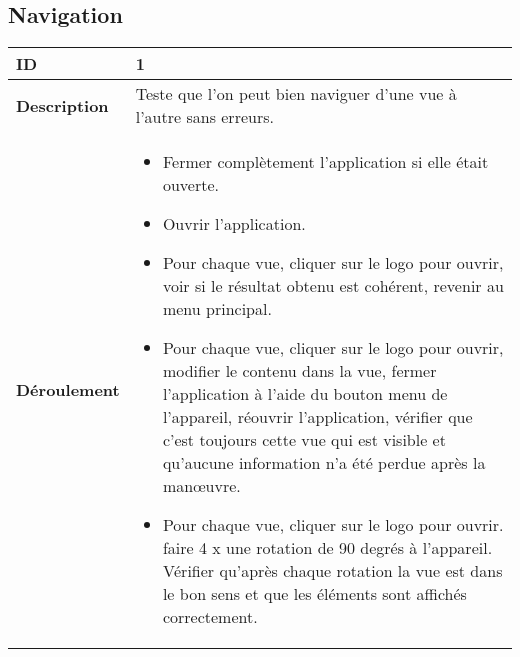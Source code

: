 	\subsection{Navigation}
				 \begin{longtable}{m{4cm}|p{10cm}|}
				 \textbf{ ID} & 1 \\
				 \hline \textbf{Description} & Teste que l'on peut bien naviguer d'une vue à l'autre sans erreurs.\\
				 \hline \textbf{Déroulement} &
					 \begin{itemize}
						 \item Fermer complètement l'application si elle était ouverte.
						 \item Ouvrir l'application.
						 \item  Pour chaque vue, cliquer sur le logo pour ouvrir, voir si le résultat obtenu est cohérent, revenir au menu principal.
						 \item  Pour chaque vue, cliquer sur le logo pour ouvrir, modifier le contenu dans la vue, fermer l'application à l'aide du bouton menu de l'appareil, réouvrir l'application, vérifier que c'est toujours cette vue qui est visible et qu'aucune information n'a été perdue après la manœuvre. 
						 \item  Pour chaque vue, cliquer sur le logo pour ouvrir. faire 4 x une rotation de 90 degrés à l'appareil. Vérifier qu'après chaque rotation la vue est dans le bon sens et que les éléments sont affichés correctement. 
					 \end{itemize}
				 \\
			 \end{longtable} 
